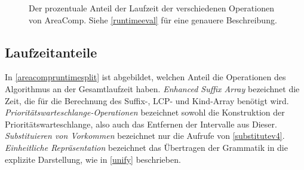 \begin{figure}
    \centering


    \caption{Der prozentuale Anteil der Laufzeit der verschiedenen Operationen von AreaComp. Siehe \autoref{runtimeeval} für eine genauere Beschreibung.}
    \label{areacompruntimesplit}
\end{figure}

\subsection{Laufzeitanteile}
\label{runtimeeval}

In \autoref{areacompruntimesplit} ist abgebildet, welchen Anteil die Operationen des Algorithmus an der Gesamtlaufzeit haben. \emph{Enhanced Suffix Array} bezeichnet die Zeit, die für die Berechnung des Suffix-, LCP- und Kind-Array benötigt wird. \emph{Prioritätswarteschlange-Operationen} bezeichnet sowohl die Konstruktion der Prioritätswarteschlange, also auch das Entfernen der Intervalle aus Dieser. \emph{Substituieren von Vorkommen} bezeichnet nur die Aufrufe von \autoref{substitutev4}. \emph{Einheitliche Repräsentation} bezeichnet das Übertragen der Grammatik in die explizite Darstellung, wie in \autoref{unify} beschrieben.


